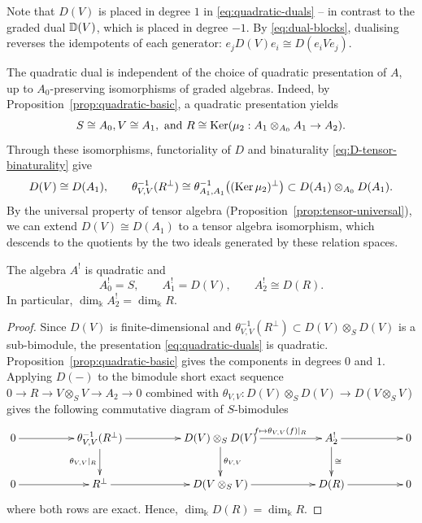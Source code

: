 Note that $D(V)$ is placed in degree $1$ in \eqref{eq:quadratic-duals} -- in contrast to the graded dual $\mathbb{D}(V)$, which is placed in degree $-1$.
By \eqref{eq:dual-blocks}, dualising reverses the idempotents of each generator: $e_jD(V)e_i\cong D(e_iVe_j)$.

The quadratic dual is independent of the choice of quadratic presentation of $A$, up to $A_0$-preserving isomorphisms of graded algebras.
Indeed, by Proposition~\ref{prop:quadratic-basic}, a quadratic presentation yields 
\[S\cong A_0, V\cong A_1, \text{ and }R\cong \operatorname{Ker}\nolimits(\mu_2:A_1\otimes_{A_0}A_1 \to A_2).
\]
Through these isomorphisms, functoriality of $D$ and binaturality \eqref{eq:D-tensor-binaturality} give
\[
D(V)\cong D(A_1),\qquad
\theta_{V,V}^{-1}(R^\perp)\cong\theta_{A_1,A_1}^{-1}\bigl((\operatorname{Ker}\nolimits\mu_2)^\perp\bigr)\subset D(A_1)\otimes_{A_0}D(A_1).
\]
By the universal property of tensor algebra (Proposition~\ref{prop:tensor-universal}), we can extend $D(V)\cong D(A_1)$ to a tensor algebra isomorphism, which descends to the quotients by the two ideals generated by these relation spaces.

\begin{proposition}\label{prop:dual-low-degrees}
The algebra $A^!$ is quadratic and
\[
A^!_0=S,\qquad A^!_1=D(V),\qquad A^!_2\cong D(R).
\]
In particular, $\dim_\Bbbk A^!_2=\dim_\Bbbk R$.
\end{proposition}

\begin{proof}
Since $D(V)$ is finite-dimensional and $\theta_{V,V}^{-1}(R^\perp)\subset D(V)\otimes_S D(V)$ is a sub-bimodule, the presentation \eqref{eq:quadratic-duals} is quadratic.
Proposition~\ref{prop:quadratic-basic} gives the components in degrees $0$ and $1$.
Applying $D(-)$ to the bimodule short exact sequence $0\to R\to V\otimes_SV \to A_2\to 0$ combined with $\theta_{V,V}:D(V)\otimes_SD(V)\to D(V\otimes_SV)$ gives the following commutative diagram of $S$-bimodules
\begin{equation}\label{eq:restriction-relations}
\xymatrix@C=50pt{
0\ar[r]& \theta_{V,V}^{-1}(R^\perp) \ar[r]\ar[d]_{\theta_{V,V}|_R} & D(V)\otimes_S D(V) \ar[r]^{\phantom{ab}f\mapsto\theta_{V,V}(f)|_R}\ar[d]^{\theta_{V,V}} &
A_2^!\ar[r]\ar[d]^{\cong} & 0\\
0\ar[r]& R^\perp \ar[r] & D(V\otimes_S V) \ar[r] & D(R)\ar[r] & 0\\
}
\end{equation}
where both rows are exact.
Hence, $\dim_\Bbbk D(R)=\dim_\Bbbk R$.
\end{proof}
%


